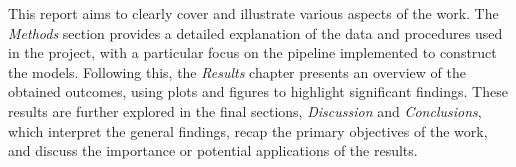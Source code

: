 This report aims to clearly cover and illustrate various aspects of the work. 
The \textit{Methods} section provides a detailed explanation of the data and procedures used in the project, with a particular focus on the pipeline implemented to construct the models. 
Following this, the \textit{Results} chapter presents an overview of the obtained outcomes, using plots and figures to highlight significant findings. 
These results are further explored in the final sections, \textit{Discussion} and \textit{Conclusions}, which interpret the general findings, recap the primary objectives of the work, and discuss the importance or potential applications of the results.


